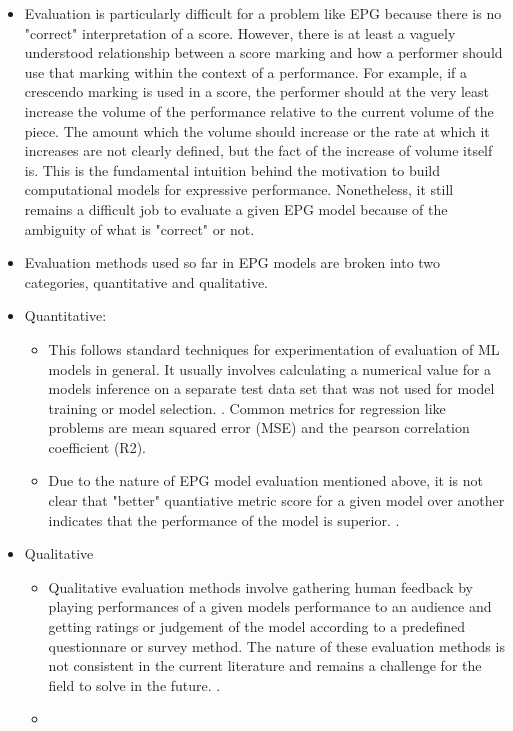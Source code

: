 \begin{itemize}
    \item Evaluation is particularly difficult for a problem like EPG because there is no "correct" interpretation of a score. However, there is at least a vaguely understood relationship between a score marking and how a performer should use that marking within the context of a performance. For example, if a crescendo marking is used in a score, the performer should at the very least increase the volume of the performance relative to the current volume of the piece. The amount which the volume should increase or the rate at which it increases are not clearly defined, but the fact of the increase of volume itself is. This is the fundamental intuition behind the motivation to build computational models for expressive performance. Nonetheless, it still remains a difficult job to evaluate a given EPG model because of the ambiguity of what is "correct" or not.
    \item Evaluation methods used so far in EPG models are broken into two categories, quantitative and qualitative. 
    \item Quantitative: 
    \begin{itemize}
        \item This follows standard techniques for experimentation of evaluation of ML models in general. It usually involves calculating a numerical value for a models inference on a separate test data set that was not used for model training or model selection. . Common metrics for regression like problems are mean squared error (MSE) and the pearson correlation coefficient (R2). 
        \item Due to the nature of EPG model evaluation mentioned above, it is not clear that "better" quantiative metric score for a given model over another indicates that the performance of the model is superior. . 
    \end{itemize}
    \item Qualitative
    \begin{itemize}
        \item Qualitative evaluation methods involve gathering human feedback by playing performances of a given models performance to an audience and getting ratings or judgement of the model according to a predefined questionnare or survey method. The nature of these evaluation methods is not consistent in the current literature and remains a challenge for the field to solve in the future. . 
        \item {}
    \end{itemize}
\end{itemize}



